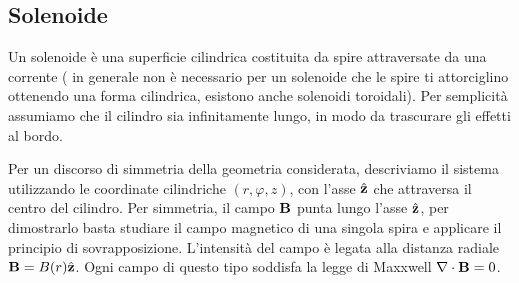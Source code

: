\subsection{Solenoide}

Un solenoide \`e una superficie cilindrica costituita da spire attraversate da una corrente ( in generale non \`e necessario per un solenoide che le spire ti attorciglino ottenendo una forma cilindrica, esistono anche solenoidi toroidali). Per semplicit\`a assumiamo che il cilindro sia infinitamente lungo, in modo da trascurare gli effetti al bordo.
\newline


Per un discorso di simmetria della geometria considerata, descriviamo il sistema utilizzando le coordinate cilindriche $(r,\varphi,z)$, con l'asse $\hat{\bold{z}}$ che attraversa il centro del cilindro. Per simmetria, il campo $\bold{B}$ punta lungo l'asse $\hat{\bold{z}}$, per dimostrarlo basta studiare il campo magnetico di una singola spira e applicare il principio di sovrapposizione. L'intensit\`a del campo \`e legata alla distanza radiale $\bold{B} = B(r) \hat{\bold{z}}$. Ogni campo di questo tipo soddisfa la legge di Maxxwell $\nabla \cdot \bold{B} = 0$.
\newline


